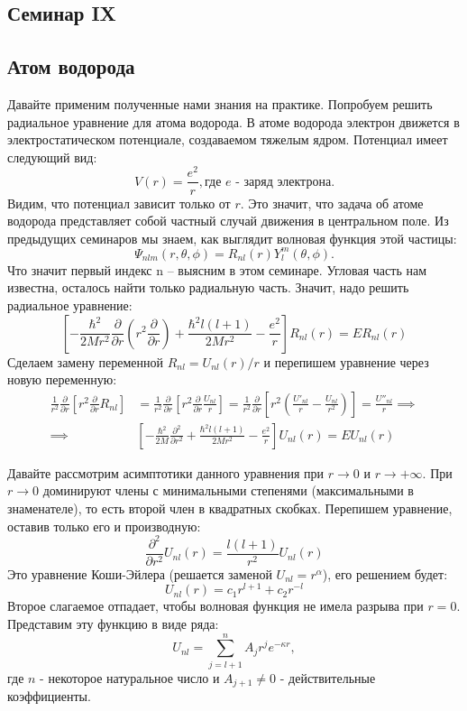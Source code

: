 \begin{center}
    \section{Семинар IX}
\end{center}
\subsection{Атом водорода}
\hspace{1em} Давайте применим полученные нами знания на практике. Попробуем решить радиальное уравнение для атома водорода. В атоме водорода электрон движется в электростатическом потенциале, создаваемом тяжелым ядром. Потенциал имеет следующий вид:
\[
V(r) = \frac{e^2}{r}, \text{где $e$ - заряд электрона}.
\]
Видим, что потенциал зависит только от $r$. Это значит, что задача об атоме водорода представляет собой частный случай движения в центральном поле. Из предыдущих семинаров мы знаем, как выглядит волновая функция этой частицы:
\[
\Psi_{nlm}(r, \theta, \phi) = R_{nl}(r)Y^m_l(\theta, \phi).
\]
Что значит первый индекс n -- выясним в этом семинаре. Угловая часть нам известна, осталось найти только радиальную часть. Значит, надо решить радиальное уравнение:
\[
\left[ -\frac{\hbar^2}{2Mr^2}\frac{\partial}{\partial r}(r^2 \frac{\partial}{\partial r}) + \frac{\hbar^2 l(l+1)}{2Mr^2} - \frac{e^2}{r}\right]R_{nl}(r) = ER_{nl}(r)
\]
Сделаем замену переменной $R_{nl}=U_{nl}(r)/r$ и перепишем уравнение через новую переменную:
\begin{align*}
\frac{1}{r^2}\frac{\partial}{\partial r}\left[ r^2 \frac{\partial}{\partial r} R_{nl} \right] &= \frac{1}{r^2}\frac{\partial}{\partial r}\left[ r^2 \frac{\partial}{\partial r} \frac{U_{nl}}{r} \right] = \frac{1}{r^2}\frac{\partial}{\partial r}\left[ r^2 \left(\frac{U'_{nl}}{r} - \frac{U_{nl}}{r^2}\right) \right] = \frac{U''_{nl}}{r} \implies \\
\implies  &\left[ -\frac{\hbar^2}{2M}\frac{\partial^2}{\partial r^2} + \frac{\hbar^2 l(l+1)}{2Mr^2} - \frac{e^2}{r}\right]U_{nl}(r) = EU_{nl}(r)
\end{align*}

Давайте рассмотрим асимптотики данного уравнения при $r \rightarrow 0$ и $r \rightarrow +\infty$. При $r \rightarrow 0$ доминируют члены с минимальными степенями (максимальными в знаменателе), то есть второй член в квадратных скобках. Перепишем уравнение, оставив только его и производную:
\[
\frac{\partial^2}{\partial r^2} U_{nl}(r) = \frac{l(l+1)}{r^2} U_{nl}(r)
\]
Это уравнение Коши-Эйлера (решается заменой $U_{nl} = r^\alpha$), его решением будет:
\[
U_{nl}(r) = c_1r^{l+1} + c_2 r^{-l}
\]
Второе слагаемое отпадает, чтобы волновая функция не имела разрыва при $r = 0$. Представим эту функцию в виде ряда:
\[
U_{nl} = \sum\limits_{j=l+1}^{n}A_j r^j e^{-\kappa r},
\]
где $n$ - некоторое натуральное число и $A_{j+1} \neq 0$ - действительные коэффициенты. 

